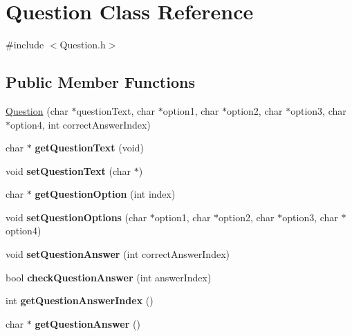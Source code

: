 \hypertarget{class_question}{}\section{Question Class Reference}
\label{class_question}


{\ttfamily \#include $<$Question.\+h$>$}

\subsection*{Public Member Functions}
\begin{DoxyCompactItemize}
\item 
\mbox{\hyperlink{class_question_a14d0ec4ad1baf10d081c5dae9fd893f1}{Question}} (char $\ast$question\+Text, char $\ast$option1, char $\ast$option2, char $\ast$option3, char $\ast$option4, int correct\+Answer\+Index)
\item 
\mbox{\label{class_question_a3f52dcb42838f53881f221ae137fb3ec}} 
char $\ast$ {\bfseries get\+Question\+Text} (void)
\item 
\mbox{\label{class_question_abf5b3fd17886372e1295644da4861d4e}} 
void {\bfseries set\+Question\+Text} (char $\ast$)
\item 
\mbox{\label{class_question_a7f288b7e474400bcb0a43c4b4256571d}} 
char $\ast$ {\bfseries get\+Question\+Option} (int index)
\item 
\mbox{\label{class_question_aa0cfa1d0899e22cf129828a22138166a}} 
void {\bfseries set\+Question\+Options} (char $\ast$option1, char $\ast$option2, char $\ast$option3, char $\ast$option4)
\item 
\mbox{\label{class_question_a03f35158c6f381619ceb35d3dfd7d814}} 
void {\bfseries set\+Question\+Answer} (int correct\+Answer\+Index)
\item 
\mbox{\label{class_question_a09e06c2e4d19140d48bb19f86a0732ec}} 
bool {\bfseries check\+Question\+Answer} (int answer\+Index)
\item 
\mbox{\label{class_question_a002816e544c48743837c402987e7db10}} 
int {\bfseries get\+Question\+Answer\+Index} ()
\item 
\mbox{\label{class_question_adc1e9883c2b9ab08d410231da6fb07bb}} 
char $\ast$ {\bfseries get\+Question\+Answer} ()
\end{DoxyCompactItemize}
